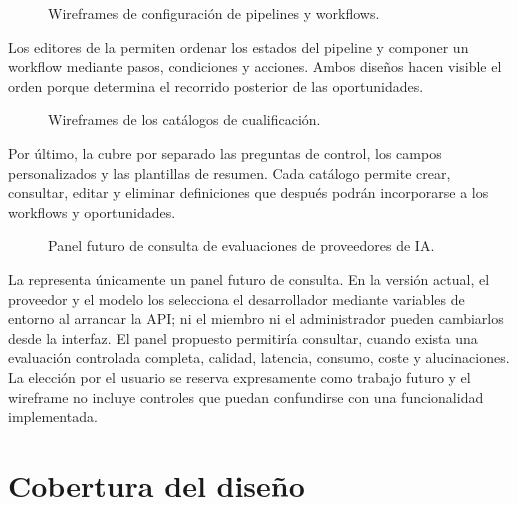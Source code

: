 \begin{figure}[H]
  \centering
  \resizebox{\textwidth}{!}{
    
  }
  \caption{Wireframes de configuración de pipelines y workflows.}
  \label{fig:wireframes-config-pipelines-workflows}
\end{figure}

Los editores de la  permiten
ordenar los estados del pipeline y componer un workflow mediante pasos,
condiciones y acciones. Ambos diseños hacen visible el orden porque determina
el recorrido posterior de las oportunidades.

\begin{figure}[H]
  \centering
  \resizebox{\textwidth}{!}{
    
  }
  \caption{Wireframes de los catálogos de cualificación.}
  \label{fig:wireframes-config-catalogs}
\end{figure}

Por último, la  cubre por separado las
preguntas de control, los campos personalizados y las plantillas de resumen.
Cada catálogo permite crear, consultar, editar y eliminar definiciones que
después podrán incorporarse a los workflows y oportunidades.

\begin{figure}[H]
  \centering
  \resizebox{\textwidth}{!}{
    
  }
  \caption{Panel futuro de consulta de evaluaciones de proveedores de IA.}
  \label{fig:wireframe-config-ai}
\end{figure}

La  representa únicamente un panel futuro de
consulta. En la versión actual, el proveedor y el modelo los selecciona el
desarrollador mediante variables de entorno al arrancar la API; ni el miembro
ni el administrador pueden cambiarlos desde la interfaz. El panel propuesto
permitiría consultar, cuando exista una evaluación controlada completa,
calidad, latencia, consumo, coste y alucinaciones. La elección por el usuario
se reserva expresamente como trabajo futuro y el wireframe no incluye controles
que puedan confundirse con una funcionalidad implementada.

\section{Cobertura del diseño}

